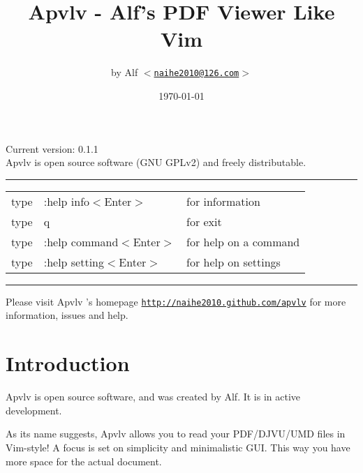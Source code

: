\documentclass[a4paper,12pt]{article}
\newcommand{\apvlv}{\textsf{Apvlv{ }}}
\begin{document}
\large

\title{Apvlv - Alf's PDF Viewer Like Vim}
\author{by Alf \texttt{$<$\href{mailto:naihe2010@126.com}{naihe2010@126.com}$>$}}
\date{\today}
\maketitle{}

\begin{center}
Current version: 0.1.1\\
\vspace{1cm}
\apvlv is open source software (GNU GPLv2) and freely distributable.
\vspace{1cm}

\rule{\textwidth}{1pt}
\begin{tabular}{lll}
type & :help info$<$Enter$>$      & for information \\
type & q                          & for exit \\
type & :help command$<$Enter$>$   & for help on a command \\
type & :help setting$<$Enter$>$   & for help on settings \\ %
\end{tabular}
\rule{\textwidth}{1pt}



\vspace{3cm}
{\small Please visit \apvlv's homepage \texttt{\href{http://naihe2010.github.com/apvlv}{http://naihe2010.github.com/apvlv}} for more information, issues and help.}
\end{center}

\newpage

\section{Introduction}\label{intro}

\apvlv is open source software, and was created by Alf. It is in active development. %

As its name suggests, \apvlv allows you to read your PDF/\-DJVU/\-UMD files in Vim-style! A focus is set on simplicity and minimalistic GUI. This way you have more space for the actual document.
\end{document}
